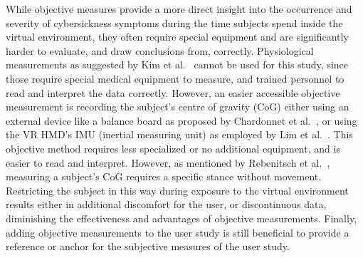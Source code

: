 While objective measures provide a more direct insight into the occurrence and severity of cybersickness symptoms
during the time subjects spend inside the virtual environment, they often require special equipment and are
significantly harder to evaluate, and draw conclusions from, correctly.
Physiological measurements as suggested by Kim et al.~\cite{Kim2005} cannot be used for this study, since those
require special medical equipment to measure, and trained personnel to read and interpret the data correctly.
However, an easier accessible objective measurement is recording the subject's centre of gravity (CoG) either using an
external device like a balance board as proposed by Chardonnet et al.~\cite{Chardonnet2015}, or using the VR HMD's
IMU (inertial measuring unit) as employed by Lim et al.~\cite{Lim2020}.
This objective method requires less specialized or no additional equipment, and is easier to read and interpret.
However, as mentioned by Rebenitsch et al.~\cite{Rebenitsch2016}, measuring a subject's CoG requires a specific
stance without movement.
Restricting the subject in this way during exposure to the virtual environment results either in additional
discomfort for the user, or discontinuous data, diminishing the effectiveness and advantages of objective measurements.
Finally, adding objective measurements to the user study is still beneficial to provide a reference or anchor for the
subjective measures of the user study.

